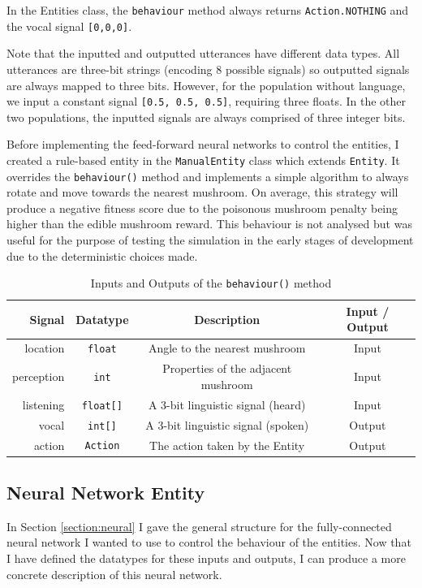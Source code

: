 \documentclass[12pt,a4paper]{report}
\begin{document}
In the Entities class, the \texttt{behaviour} method always returns \texttt{Action.NOTHING} and the vocal signal \texttt{[0,0,0]}.

Note that the inputted and outputted utterances have different data types. All utterances are three-bit strings (encoding 8 possible signals) so outputted signals are always mapped to three bits. However, for the population without language, we input a constant signal \texttt{[0.5, 0.5, 0.5]}, requiring three floats. In the other two populations, the inputted  signals are always comprised of three integer bits.

Before implementing the feed-forward neural networks to control the entities, I created a rule-based entity in the \texttt{ManualEntity} class which extends \texttt{Entity}. It overrides the \texttt{behaviour()} method and implements a simple algorithm to always rotate and move towards the nearest mushroom. On average, this strategy will produce a negative fitness score due to the poisonous mushroom penalty being higher than the edible mushroom reward. This behaviour is not analysed but was useful for the purpose of testing the simulation in the early stages of development due to the deterministic choices made.

\begin{table}[t]
\centering
 \begin{tabular}{ r | c | c | c}
 \bf{Signal} & \bf{Datatype} & \bf{Description} & \bf{Input / Output} \\ [0.5ex] 
 \hline
location & \texttt{float} & Angle to the nearest mushroom & Input \\
perception & \texttt{int} & Properties of the adjacent mushroom & Input \\
listening & \texttt{float[]} & A 3-bit linguistic signal (heard) & Input \\
vocal & \texttt{int[]} & A 3-bit linguistic signal (spoken) & Output \\
action & \texttt{Action} & The action taken by the Entity & Output \\
\end{tabular}
\caption{Inputs and Outputs of the \texttt{behaviour()} method}
\label{table:behaviour}
\end{table}

\subsection{Neural Network Entity}

In Section \ref{section:neural} I gave the general structure for the fully-connected neural network I wanted to use to control the behaviour of the entities. Now that I have defined the datatypes for these inputs and outputs, I can produce a more concrete description of this neural network. 
\end{document}
